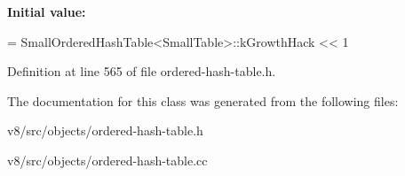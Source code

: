 {\bfseries Initial value\+:}
\begin{DoxyCode}
=
      SmallOrderedHashTable<SmallTable>::kGrowthHack << 1
\end{DoxyCode}


Definition at line 565 of file ordered-\/hash-\/table.\+h.



The documentation for this class was generated from the following files\+:\begin{DoxyCompactItemize}
\item 
v8/src/objects/ordered-\/hash-\/table.\+h\item 
v8/src/objects/ordered-\/hash-\/table.\+cc\end{DoxyCompactItemize}
